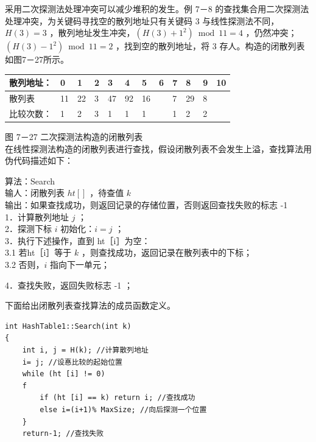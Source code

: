 \documentclass[10pt]{article}
\begin{document}
采用二次探测法处理冲突可以减少堆积的发生。例 7－8 的查找集合用二次探测法处理冲突，为关键码寻找空的散列地址只有关键码 3 与线性探测法不同，$H(3)=3$ ，散列地址发生冲突，$\left(H(3)+1^{2}\right) \bmod 11=4$ ，仍然冲突；$\left(H(3)-1^{2}\right) \bmod 11=2$ ，找到空的散列地址，将 3 存人。构造的闭散列表如图7－27所示。

\begin{center}
\begin{tabular}{|l|l|l|l|l|l|l|l|l|l|l|l|}
\hline
散列地址： & 0 & 1 & 2 & 3 & 4 & 5 & 6 & 7 & 8 & 9 & 10 \\
\hline
散列表 & 11 & 22 & 3 & 47 & 92 & 16 &  & 7 & 29 & 8 &  \\
\hline
比较次数： & 1 & 2 & 3 & 1 & 1 & 1 &  & 1 & 2 & 2 &  \\
\hline
\end{tabular}
\end{center}

图 7－27 二次探测法构造的闭散列表\\
在线性探测法构造的闭散列表进行查找，假设闭散列表不会发生上溢，查找算法用伪代码描述如下：

算法：Search\\
输人：闭散列表 $h t[]$ ，待查值 $k$\\
输出：如果查找成功，则返回记录的存储位置，否则返回查找失败的标志 -1\\
1．计算散列地址 $j$ ；\\
2．探测下标 $i$ 初始化：$i=j$ ；\\
3．执行下述操作，直到 ht［i］为空：\\
3.1 若ht［i］等于 $k$ ，则查找成功，返回记录在散列表中的下标；\\
3.2 否则，$i$ 指向下一单元；

4．查找失败，返回失败标志 -1 ；

下面给出闭散列表查找算法的成员函数定义。

\begin{verbatim}
int HashTable1::Search(int k)
{
    int i, j = H(k); //计算散列地址
    i= j; //设惪比较的起始位置
    while (ht [i] != 0)
    f
        if (ht [i] == k) return i; //查找成功
        else i=(i+1)% MaxSize; //向后探测一个位置
    }
    return-1; //查找失败
\end{verbatim}
\end{document}
